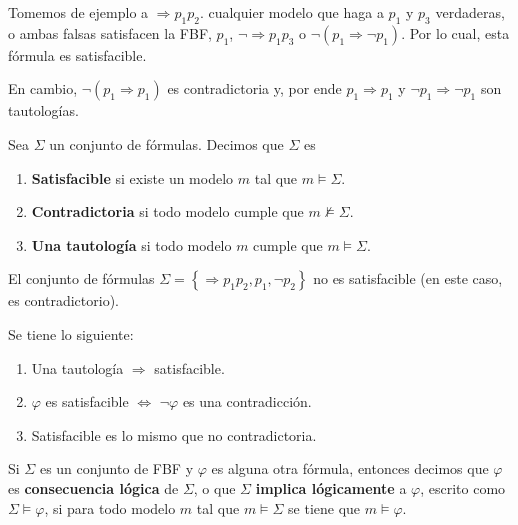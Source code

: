 \documentclass[12pt]{report}
\theoremstyle{largebreak}
\begin{document}
    \begin{exa}
        Tomemos de ejemplo a $\Rightarrow p_1 p_2$. cualquier modelo que haga a $p_1$ y $p_3$ verdaderas, o ambas falsas satisfacen la FBF, $p_1$, $\neg\Rightarrow p_1 p_3$ o $\neg(p_1\Rightarrow\neg p_1)$. Por lo cual, esta fórmula es satisfacible.

        En cambio, $\neg(p_1\Rightarrow p_1)$ es contradictoria y, por ende $p_1\Rightarrow p_1$ y $\neg p_1\Rightarrow\neg p_1$ son tautologías.
    \end{exa}

    \begin{mydef}
        Sea $\Sigma$ un conjunto de fórmulas. Decimos que $\Sigma$ es
        \begin{enumerate}
            \item \textbf{Satisfacible} si existe un modelo $m$ tal que $m\vDash\Sigma$.
            \item \textbf{Contradictoria} si todo modelo cumple que $m\nvDash\Sigma$.
            \item \textbf{Una tautología} si todo modelo $m$ cumple que $m\vDash\Sigma$.
        \end{enumerate}
    \end{mydef}

    \begin{exa}
        El conjunto de fórmulas $\Sigma=\left\{\Rightarrow p_1p_2, p_1,\neg p_2 \right\}$ no es satisfacible (en este caso, es contradictorio).
    \end{exa}

    \begin{obs}
        Se tiene lo siguiente:
        \begin{enumerate}
            \item Una tautología $\Rightarrow$ satisfacible.
            \item $\varphi$ es satisfacible $\iff$ $\neg\varphi$ es una contradicción.
            \item Satisfacible es lo mismo que no contradictoria.
        \end{enumerate}
    \end{obs}

    \begin{mydef}
        Si $\Sigma$ es un conjunto de FBF y $\varphi$ es alguna otra fórmula, entonces decimos que $\varphi$ es \textbf{consecuencia lógica} de $\Sigma$, o que $\Sigma$ \textbf{implica lógicamente} a $\varphi$, escrito como $\Sigma\vDash\varphi$, si para todo modelo $m$ tal que $m\vDash\Sigma$ se tiene que $m\vDash\varphi$.
    \end{mydef}
\end{document}
